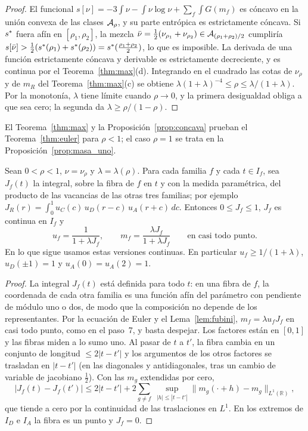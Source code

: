 \begin{proof}
El funcional $s[\nu]=-3\int\nu-\int\nu\log\nu+\sum_f\int G(m_f)$ es cóncavo en la unión convexa de
las clases ${\mathcal{A}}_\rho$, y su parte entrópica es estrictamente cóncava. Si $s^{*}$ fuera afín en
$[\rho_1,\rho_2]$, la mezcla $\bar\nu=\frac12(\nu_{\rho_1}+\nu_{\rho_2})\in{\mathcal{A}}_{(\rho_1+\rho_2)/2}$
cumpliría $s[\bar\nu]>\frac12(s^{*}(\rho_1)+s^{*}(\rho_2))=s^{*}(\frac{\rho_1+\rho_2}2)$, lo que es
imposible. La derivada de una función estrictamente cóncava y derivable es estrictamente decreciente,
y es continua por el Teorema~\ref{thm:max}(d). Integrando en el cuadrado las cotas de
$\nu_\rho$ y de $m_R$ del Teorema~\ref{thm:max}(c) se obtiene
$\lambda(1+\lambda)^{-4}\le\rho\le\lambda/(1+\lambda)$. Por la monotonía, $\lambda$ tiene límite cuando
$\rho\to0$, y la primera desigualdad obliga a que sea cero; la segunda da $\lambda\ge\rho/(1-\rho)$.
\end{proof}

El Teorema~\ref{thm:max} y la Proposición~\ref{prop:concava} prueban el Teorema~\ref{thm:euler}
para $\rho<1$; el caso $\rho=1$ se trata en la Proposición~\ref{prop:masa_uno}.

\begin{lema}\label{lem:vacancias}
Sean $0<\rho<1$, $\nu=\nu_\rho$ y $\lambda=\lambda(\rho)$. Para cada familia $f$ y cada $t\in I_f$,
sea $J_f(t)$ la integral, sobre la fibra de $f$ en $t$ y con la medida paramétrica, del producto de
las vacancias de las otras tres familias; por ejemplo
$J_R(r)=\int_0^1u_C(c)\,u_D(r-c)\,u_A(r+c)\,dc$. Entonces $0\le J_f\le1$, $J_f$ es continua en $I_f$ y
\[
 u_f=\frac1{1+\lambda J_f},\qquad m_f=\frac{\lambda J_f}{1+\lambda J_f}\qquad\text{en casi todo punto}.
\]
En lo que sigue usamos estas versiones continuas. En particular $u_f\ge1/(1+\lambda)$,
$u_D(\pm1)=1$ y $u_A(0)=u_A(2)=1$.
\end{lema}

\begin{proof}
La integral $J_f(t)$ está definida para todo $t$: en una fibra de $f$, la coordenada de cada otra
familia es una función afín del parámetro con pendiente de módulo uno o dos, de modo que la
composición no depende de los representantes. Por la ecuación de Euler y el Lema~\ref{lem:fubini},
$m_f=\lambda u_fJ_f$ en casi todo punto, como en el paso~7, y basta despejar. Los factores están en $[0,1]$ y las fibras miden a lo sumo uno. Al
pasar de $t$ a $t'$, la fibra cambia en un conjunto de longitud $\le2|t-t'|$ y los argumentos de los
otros factores se trasladan en $|t-t'|$ (en las diagonales y antidiagonales, tras un cambio de
variable de jacobiano $\frac12$). Con las $m_g$ extendidas por cero,
\[
 |J_f(t)-J_f(t')|\le2|t-t'|+2\sum_{g\ne f}\ \sup_{|h|\le|t-t'|}\|m_g(\cdot+h)-m_g\|_{L^1(\mathbb R)},
\]
que tiende a cero por la continuidad de las traslaciones en $L^1$. En los extremos de $I_D$ e $I_A$
la fibra es un punto y $J_f=0$.
\end{proof}

